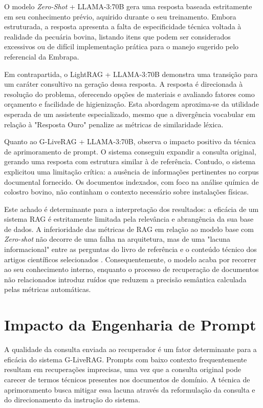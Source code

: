 O modelo \textit{Zero-Shot} + LLAMA-3:70B gera uma resposta baseada estritamente em seu conhecimento prévio, aquirido durante o seu treinamento. Embora estruturada, a resposta apresenta a falta de especificidade técnica voltada à realidade da pecuária bovina, listando itens que podem ser considerados excessivos ou de difícil implementação prática para o manejo sugerido pelo referencial da Embrapa.

Em contrapartida, o LightRAG + LLAMA-3:70B demonstra uma transição para um caráter consultivo na geração dessa resposta. A resposta é direcionada à resolução do problema, oferecendo opções de materiais e avaliando fatores como orçamento e facilidade de higienização. Esta abordagem aproxima-se da utilidade esperada de um assistente especializado, mesmo que a divergência vocabular em relação à "Resposta Ouro" penalize as métricas de similaridade léxica.

Quanto ao G-LiveRAG + LLAMA-3:70B, observa o impacto positivo da técnica de aprimoramento de prompt. O sistema conseguiu expandir a consulta original, gerando uma resposta com estrutura similar à de referência. Contudo, o sistema explicitou uma limitação crítica: a ausência de informações pertinentes no corpus documental fornecido. Os documentos indexados, com foco na análise química de colostro bovino, não continham o contexto necessário sobre instalações físicas.

Este achado é determinante para a interpretação dos resultados: a eficácia de um sistema RAG é estritamente limitada pela relevância e abrangência da sua base de dados. A inferioridade das métricas de RAG em relação ao modelo base com \textit{Zero-shot} não decorre de uma falha na arquitetura, mas de uma "lacuna informacional" entre as perguntas do livro de referência e o conteúdo técnico dos artigos científicos selecionados \cite{GONTIJO2025101097}. Consequentemente, o modelo acaba por recorrer ao seu conhecimento interno, enquanto o processo de recuperação de documentos não relacionados introduz ruídos que reduzem a precisão semântica calculada pelas métricas automáticas.

\section{Impacto da Engenharia de Prompt}
A qualidade da consulta enviada ao recuperador é um fator determinante para a eficácia do sistema G-LiveRAG. Prompts com baixo contexto frequentemente resultam em recuperações imprecisas, uma vez que a consulta original pode carecer de termos técnicos presentes nos documentos de domínio. A técnica de aprimoramento busca mitigar essa lacuna através da reformulação da consulta e do direcionamento da instrução do sistema.

